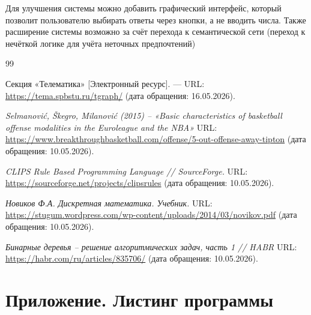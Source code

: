\documentclass[a4paper, final]{article}
\begin{document}
Для улучшения системы можно добавить графический интерфейс, который позволит пользователю выбирать ответы через кнопки, а не вводить числа. Также расширение системы возможно за счёт перехода к семантической сети
(переход к нечёткой логике для учёта неточных предпочтений)

\newpage

\begin{thebibliography}{99}

Секция «Телематика» [Электронный ресурс]. ---
URL: \url{https://tema.spbstu.ru/tgraph/} (дата обращения: 16.05.2026).

\textit{Selmanović, Škegro, Milanović (2015) -- «Basic characteristics of basketball offense modalities in the Euroleague and the NBA»}
URL: \url{https://www.breakthroughbasketball.com/offense/5-out-offense-away-tipton}
(дата обращения: 10.05.2026).

\textit{CLIPS Rule Based Programming Language // SourceForge.}
URL: \url{https://sourceforge.net/projects/clipsrules}
(дата обращения: 10.05.2026).

\textit{Новиков Ф.А. Дискретная математика. Учебник.} 
URL: \url {https://stugum.wordpress.com/wp-content/uploads/2014/03/novikov.pdf}
(дата обращения: 10.05.2026).


\textit{Бинарные деревья -- решение алгоритмических задач, часть 1 // HABR} 
URL: \url{https://habr.com/ru/articles/835706/}
(дата обращения: 10.05.2026).


\end{thebibliography}

\newpage

\section*{Приложение. Листинг программы}


\end{document}
